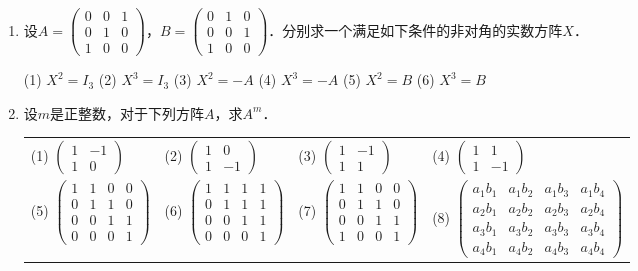 \documentclass[a4paper,fontset=windows]{ctexbook}
\theoremstyle{definition}
\begin{document}
\begin{enumerate}
\item 设$A=\begin{pmatrix}0&0&1 \\ 0&1&0 \\ 1&0&0\end{pmatrix}$，$B=\begin{pmatrix}0&1&0 \\ 0&0&1 \\ 1&0&0\end{pmatrix}$．分别求一个满足如下条件的非对角的实数方阵$X$．

(1) $X^2=I_3$ \quad (2) $X^3=I_3$ \quad (3) $X^2=-A$ \quad
(4) $X^3=-A$ \quad (5) $X^2=B$ \quad (6) $X^3=B$

\item 设$m$是正整数，对于下列方阵$A$，求$A^m$．

\hspace*{-6pt}\begin{tabular}{llll}
(1) $\begin{pmatrix}1&-1 \\ 1&0\end{pmatrix}$ &
(2) $\begin{pmatrix}1&0 \\ 1&-1\end{pmatrix}$ &
(3) $\begin{pmatrix}1&-1 \\ 1&1\end{pmatrix}$ &
(4) $\begin{pmatrix}1&1 \\ 1&-1\end{pmatrix}$ \\
(5) $\begin{pmatrix}1&1&0&0 \\ 0&1&1&0 \\ 0&0&1&1 \\ 0&0&0&1\end{pmatrix}$ &
(6) $\begin{pmatrix}1&1&1&1 \\ 0&1&1&1 \\ 0&0&1&1 \\ 0&0&0&1\end{pmatrix}$ &
(7) $\begin{pmatrix}1&1&0&0 \\ 0&1&1&0 \\ 0&0&1&1 \\ 1&0&0&1\end{pmatrix}$ &
(8) $\begin{pmatrix}a_1b_1&a_1b_2&a_1b_3&a_1b_4 \\ a_2b_1&a_2b_2&a_2b_3&a_2b_4 \\ a_3b_1&a_3b_2&a_3b_3&a_3b_4 \\ a_4b_1&a_4b_2&a_4b_3&a_4b_4\end{pmatrix}$
\end{tabular}


\end{enumerate}
\end{document}

